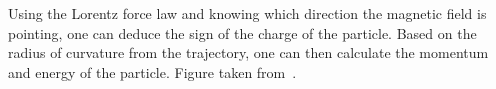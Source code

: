 \begin{multiFigure}
{        Using the Lorentz force law and knowing which direction the magnetic field is pointing, one can deduce the sign of the charge of the particle. 
        Based on the radius of curvature from the trajectory, one can then calculate the momentum and energy of the particle.
        Figure taken from~\cite{aaboud_measurement_2018}. %
        } 
    \label{fig:cms_particle_trajectories}
\end{multiFigure}
\newpage

